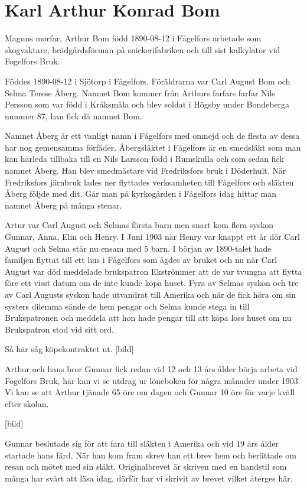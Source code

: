 \chapter{Karl Arthur Konrad Bom}
\label{karl_arthur_konrad_bom}
Magnus morfar, Arthur Bom född 1890-08-12 i Fågelfors arbetade som skogvaktare, brädgårdsförman på snickerifabriken  och till sist kalkylator vid Fogelfors Bruk.

Föddes 1890-08-12 i Sjötorp i Fågelfors. Föräldrarna var Carl August Bom och Selma Terese Åberg. Namnet Bom kommer från Arthurs farfars farfar Nils Persson som var född i Kråksmåla och blev soldat i Högsby under Bondeberga nummer 87, han fick då namnet Bom.

Namnet Åberg är ett vanligt namn i Fågelfors med omnejd och de flesta av dessa har nog gemensamma förfäder. Åbergsläktet i Fågelfors är en smedsläkt som man kan härleda tillbaka till en Nils Larsson född i Rumskulla och som sedan fick namnet Åberg. Han blev smedmästare vid Fredriksfors bruk i Döderhult. När Fredriksfors järnbruk lades ner flyttades verksamheten till Fågelfors och släkten Åberg följde med dit. Går man på kyrkogården i Fågelfors idag hittar man namnet  Åberg på många stenar.

Artur var  Carl August och Selmas första barn men snart kom flera syskon Gunnar, Anna, Elin och Henry.  I Juni 1903 när Henry var knappt ett år dör Carl August och Selma står nu ensam med 5 barn.  I början av 1890-talet hade familjen flyttat till ett hus i Fågelfors som ägdes av bruket och nu när Carl August var död meddelade brukspatron Ekströmmer att de var tvungna att flytta före ett visst datum om de inte kunde köpa huset. Fyra av Selmas syskon och tre av Carl Augusts syskon hade utvandrat till Amerika och när de fick höra om sin systers dilemma sände de hem pengar och Selma kunde stega in till Brukspatronen och meddela att hon hade pengar till att köpa loss huset om nu Brukspatron stod vid sitt ord.

Så här såg köpekontraktet ut. [bild]

Arthur och hans bror Gunnar fick redan vid 12 och 13 års ålder börja arbeta vid Fogelfors Bruk, här kan vi se utdrag ur löneboken för några månader under 1903. Vi kan se att Arthur tjänade 65 öre om dagen och Gunnar 10 öre för varje kväll efter skolan.

[bild]

Gunnar beslutade sig för att fara till släkten i Amerika och vid 19 års ålder startade hans färd. När han kom fram skrev han ett brev hem och berättade om resan och mötet med sin släkt. Originalbrevet är skriven med en handstil som många har svårt att läsa idag, därför har vi skrivit av brevet vilket återges här.

